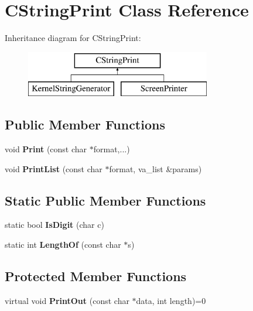 \hypertarget{class_c_string_print}{}\section{C\+String\+Print Class Reference}
\label{class_c_string_print}
Inheritance diagram for C\+String\+Print\+:\begin{figure}[H]
\begin{center}
\leavevmode
\includegraphics[height=2.000000cm]{class_c_string_print}
\end{center}
\end{figure}
\subsection*{Public Member Functions}
\begin{DoxyCompactItemize}
\item 
\mbox{\label{class_c_string_print_a5ffc4491ea6865195c5163d1f83b309e}} 
void {\bfseries Print} (const char $\ast$format,...)
\item 
\mbox{\label{class_c_string_print_aa59dd1d5fd21a71f0ccb2c9bc3adb05b}} 
void {\bfseries Print\+List} (const char $\ast$format, va\+\_\+list \&params)
\end{DoxyCompactItemize}
\subsection*{Static Public Member Functions}
\begin{DoxyCompactItemize}
\item 
\mbox{\label{class_c_string_print_ad0fbb4a5886e3eb0f814046e76ded7d9}} 
static bool {\bfseries Is\+Digit} (char c)
\item 
\mbox{\label{class_c_string_print_a7fc2eff4d7f56cb742d61840c6529a1e}} 
static int {\bfseries Length\+Of} (const char $\ast$s)
\end{DoxyCompactItemize}
\subsection*{Protected Member Functions}
\begin{DoxyCompactItemize}
\item 
\mbox{\label{class_c_string_print_a80897c8c98fcf5047730b82d5a029098}} 
virtual void {\bfseries Print\+Out} (const char $\ast$data, int length)=0
\end{DoxyCompactItemize}
